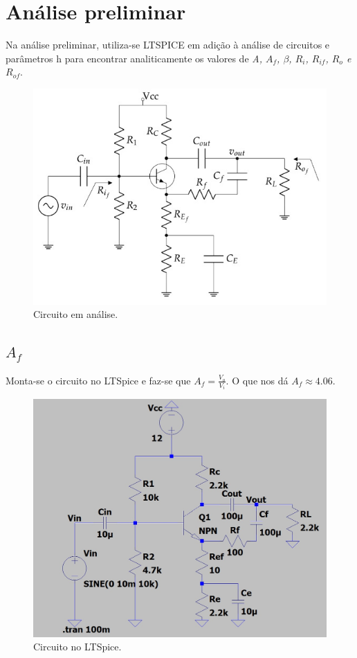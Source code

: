 \section{Análise preliminar}

Na análise preliminar, utiliza-se LTSPICE em adição à análise de circuitos e parâmetros h para encontrar analiticamente os valores de \emph{A, $A_f$, $\beta$, $R_i$, $R_{if}$, $R_o$ e $R_{o f}$}.

\begin{figure}[h]
    \centering
    \includegraphics[width=0.5\columnwidth]{Images/o_circuito.png}
    \caption{Circuito em análise.}
\end{figure}

\subsection{$A_f$}

Monta-se o circuito no LTSpice e faz-se que $A_f = \frac{V_o}{V_i}$. O que nos dá $A_f \approx 4.06$.

\begin{figure}[h]
    \centering
    \includegraphics[width=0.5\columnwidth]{Images/circuito_ltspice.jpeg}
    \caption{Circuito no LTSpice.}
\end{figure}

